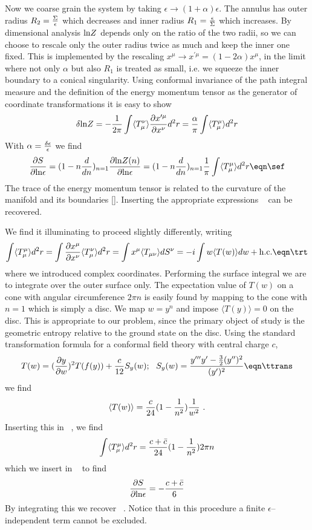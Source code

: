Now we coarse grain the system by taking
$\epsilon\rightarrow (1+\alpha)\epsilon$.
The annulus has outer radius $R_2={\Sigma\over\epsilon}$ which decreases
and inner radius $R_1={\epsilon\over\Sigma}$ which increases. By dimensional
analysis ${\rm ln}Z$ depends only on the ratio of the two radii,
so we can choose to rescale only the outer radius twice as much and keep
the inner one fixed. This is implemented by the rescaling
$x^{\mu}\rightarrow x^{\prime\mu}=(1-2\alpha)x^{\mu}$, in the
limit where not only $\alpha$ but also $R_1$ is treated as small,
i.e. we squeeze the inner boundary to a conical singularity.
Using conformal invariance of the path integral measure
and the definition of the energy momentum tensor
as the generator of coordinate transformations it is easy to show
$$
\delta{\rm ln}Z = -{1\over 2\pi}\int \langle T_{\mu}^{\nu}\rangle
{\partial x^{\prime\mu}\over\partial x^{\nu}}d^2 r
= {\alpha\over \pi}\int \langle T_{\mu}^{\mu}\rangle d^2 r
$$
With $\alpha={\delta\epsilon\over\epsilon}$ we find
$$
{\partial S\over\partial{\rm ln}\epsilon}
=(1-n{d\over dn})_{n=1}{\partial{\rm ln}Z(n)\over\partial{\rm ln}\epsilon}
=(1-n{d\over dn})_{n=1}{1\over \pi}\int\langle T_{\mu}^{\mu}\rangle d^2 r
\eqn\sef
$$
The trace of the energy momentum tensor is related to
the curvature of the manifold and its boundaries [\cardy ].
Inserting the appropriate expressions \se~ can be recovered.

We find it illuminating to proceed
slightly differently, writing
$$
\int \langle T_{\mu}^{\mu}\rangle d^2 r =
\int {\partial x^{\mu}\over\partial x^{\nu}}
\langle T_{\mu}^{\nu}\rangle d^2 r
= \int x^{\mu}\langle T_{\mu\nu}\rangle dS^{\nu}
= -i \int w\langle T(w)\rangle dw + {\rm h.c.}
\eqn\trt
$$
where we introduced complex coordinates. Performing the surface integral
we are to integrate over the outer surface only.
The expectation value of $T(w)$ on a cone with angular circumference
$2\pi n$ is easily found by mapping to the cone with $n=1$ which
is simply a disc.
We map $w=y^n$ and impose $\langle T(y)\rangle=0$ on the disc.
This is appropriate to our problem, since the primary object of study
is the geometric entropy relative to
the ground state on the disc.
Using the standard transformation formula for a conformal field theory
with central charge $c$,
$$
T(w)=({\partial y\over\partial w})^2 T(f(y)) + {c\over 12}S_y(w);
{}~~S_y(w)={y^{\prime\prime\prime}y^{\prime}-
{3\over 2}(y^{\prime\prime})^2\over (y^{\prime})^2}
\eqn\ttrans
$$
we find
$$
\langle T(w)\rangle={c\over 24} (1-{1\over n^2}) {1\over w^2}~.
$$
Inserting this in \trt~, we find
$$
\int \langle T_{\mu}^{\mu} \rangle d^2 r=
{c+\bar{c}\over 24} (1-{1\over n^2})2\pi n
$$
which we insert in \sef~ to
find
$$
{\partial S\over\partial{\rm ln}\epsilon}= - {c+\bar{c}\over 6}
$$
By integrating this
we recover \se~. Notice that
in this procedure a finite $\epsilon$--independent term
cannot be excluded.

